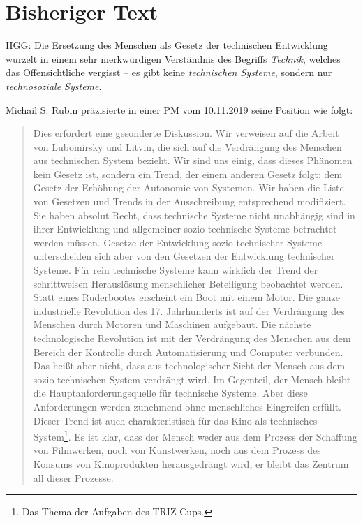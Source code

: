 \documentclass[11pt,a4paper]{article}
\begin{document}
\section{Bisheriger Text}

HGG: Die Ersetzung des Menschen als Gesetz der technischen Entwicklung wurzelt
in einem sehr merkwürdigen Verständnis des Begriffs \emph{Technik}, welches
das Offensichtliche vergisst -- es gibt keine \emph{technischen Systeme},
sondern nur \emph{technosoziale Systeme}.

Michail S. Rubin präzisierte in einer PM vom 10.11.2019 seine Position wie
folgt:
\begin{quote}
  Dies erfordert eine gesonderte Diskussion. Wir verweisen auf die Arbeit von
  Lubomirsky und Litvin, die sich auf die Verdrängung des Menschen aus
  technischen System bezieht.  Wir sind uns einig, dass dieses Phänomen kein
  Gesetz ist, sondern ein Trend, der einem anderen Gesetz folgt: dem Gesetz
  der Erhöhung der Autonomie von Systemen.  Wir haben die Liste von Gesetzen
  und Trends in der Ausschreibung entsprechend modifiziert. Sie haben absolut
  Recht, dass technische Systeme nicht unabhängig sind in ihrer Entwicklung
  und allgemeiner sozio-technische Systeme betrachtet werden müssen. Gesetze
  der Entwicklung sozio-technischer Systeme unterscheiden sich aber von den
  Gesetzen der Entwicklung technischer Systeme. Für rein technische Systeme
  kann wirklich der Trend der schrittweisen Herauslösung menschlicher
  Beteiligung beobachtet werden. Statt eines Ruderbootes erscheint ein Boot
  mit einem Motor. Die ganze industrielle Revolution des 17. Jahrhunderts ist
  auf der Verdrängung des Menschen durch Motoren und Maschinen aufgebaut. Die
  nächste technologische Revolution ist mit der Verdrängung des Menschen aus
  dem Bereich der Kontrolle durch Automatisierung und Computer verbunden. Das
  heißt aber nicht, dass aus technologischer Sicht der Mensch aus dem
  sozio-technischen System verdrängt wird. Im Gegenteil, der Mensch bleibt die
  Hauptanforderungsquelle für technische Systeme. Aber diese Anforderungen
  werden zunehmend ohne menschliches Eingreifen erfüllt. Dieser Trend ist auch
  charakteristisch für das Kino als technisches System\footnote{Das Thema der
    Aufgaben des TRIZ-Cups.}. Es ist klar, dass der Mensch weder aus dem
  Prozess der Schaffung von Filmwerken, noch von Kunstwerken, noch aus dem
  Prozess des Konsums von Kinoprodukten herausgedrängt wird, er bleibt das
  Zentrum all dieser Prozesse.
\end{quote}
\end{document}
